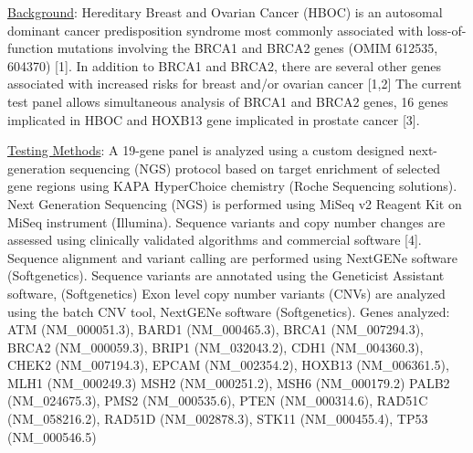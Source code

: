 \documentclass[10pt]{article}
\begin{document}
\hfill \parbox{19cm}{
\underline{Background}: Hereditary Breast and Ovarian Cancer (HBOC) is an autosomal dominant cancer predisposition syndrome most commonly associated with loss-of-function mutations involving the BRCA1 and BRCA2 genes (OMIM 612535, 604370) [1]. In addition to BRCA1 and BRCA2, there are several other genes associated with increased risks for breast and/or ovarian cancer [1,2] The current test panel allows simultaneous analysis of BRCA1 and BRCA2 genes, 16 genes implicated in HBOC and HOXB13 gene implicated in prostate cancer [3].

\vspace{1em}
\underline{Testing Methods}: A 19-gene panel is analyzed using a custom designed next-generation sequencing (NGS) protocol based on target enrichment of selected gene regions using KAPA HyperChoice chemistry (Roche Sequencing solutions). Next Generation Sequencing (NGS) is performed using MiSeq v2 Reagent Kit on MiSeq instrument (Illumina). Sequence variants and copy number changes are assessed using clinically validated algorithms and commercial software [4]. Sequence alignment and variant calling are performed using NextGENe software (Softgenetics). Sequence variants are annotated using the Geneticist Assistant software, (Softgenetics) Exon level copy number variants (CNVs) are analyzed using the batch CNV tool, NextGENe software (Softgenetics).
Genes analyzed: ATM (NM\_000051.3), BARD1 (NM\_000465.3), BRCA1 (NM\_007294.3), BRCA2 (NM\_000059.3), BRIP1 (NM\_032043.2), CDH1 (NM\_004360.3), CHEK2 (NM\_007194.3), EPCAM (NM\_002354.2), HOXB13 (NM\_006361.5), MLH1 (NM\_000249.3) MSH2 (NM\_000251.2), MSH6 (NM\_000179.2) PALB2 (NM\_024675.3), PMS2 (NM\_000535.6), PTEN (NM\_000314.6), RAD51C (NM\_058216.2), RAD51D (NM\_002878.3), STK11 (NM\_000455.4), TP53 (NM\_000546.5)
}
\end{document}
